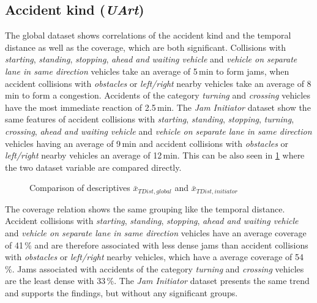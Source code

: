 \subsection{Accident kind (\textit{UArt})}
\label{analysis_sum_UArt}
The global dataset shows correlations of the accident kind and the temporal distance as well as the coverage, which are both significant. Collisions with \textit{starting}, \textit{standing}, \textit{stopping}, \textit{ahead and waiting vehicle} and \textit{vehicle on separate lane in same direction} vehicles take an average of 5\,min to form jams, when accident collisions with \textit{obstacles} or \textit{left/right} nearby vehicles take an average of 8\,min to form a congestion. Accidents of the category \textit{turning} and \textit{crossing} vehicles have the most immediate reaction of 2.5\,min. The \textit{Jam Initiator} dataset show the same features of accident collisions with \textit{starting}, \textit{standing}, \textit{stopping}, \textit{turning}, \textit{crossing}, \textit{ahead and waiting vehicle} and \textit{vehicle on separate lane in same direction} vehicles having an average of 9\,min and accident collisions with \textit{obstacles} or \textit{left/right} nearby vehicles an average of 12\,min. This can be also seen in \cref{fig:baysis_summary_UArt1_TDist_barplot} where the two dataset variable are compared directly.
\begin{figure}[ht!]
    \data
    \pgfplotstablesort[sort key=means, sort cmp=float >]{\datasorted}{\data}
    \tiny
    \centering
    \caption{Comparison of descriptives $\bar{x}_{TDist,global}$ and $\bar{x}_{TDist,initiator}$}
    \label{fig:baysis_summary_UArt1_TDist_barplot}
\end{figure}
The coverage relation shows the same grouping like the temporal distance. Accident collisions with \textit{starting}, \textit{standing}, \textit{stopping}, \textit{ahead and waiting vehicle} and \textit{vehicle on separate lane in same direction} vehicles have an average coverage of 41\,\% and are therefore associated with less dense jams than accident collisions with \textit{obstacles} or \textit{left/right} nearby vehicles, which have a average coverage of 54\,\%. Jams associated with accidents of the category \textit{turning} and \textit{crossing} vehicles are the least dense with 33\,\%. The \textit{Jam Initiator} dataset presents the same trend and supports the findings, but without any significant groups.

